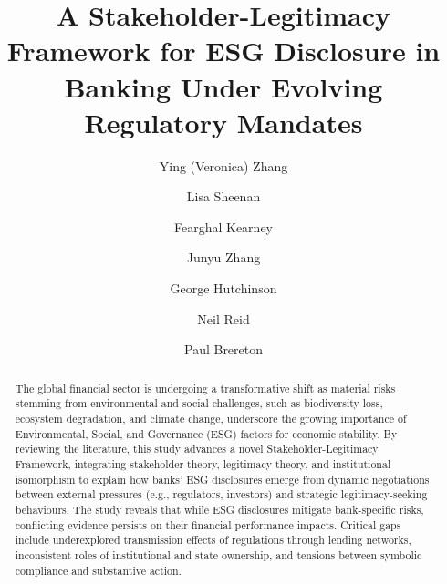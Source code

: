 \documentclass[
  authoryear]{elsarticle}
\begin{document}
\begin{frontmatter}
\title{A Stakeholder-Legitimacy Framework for ESG Disclosure in Banking
Under Evolving Regulatory Mandates}

\author[1]{Ying (Veronica) Zhang%
%
}
\author[1,2]{Lisa Sheenan%
%
}

\author[3]{Fearghal Kearney%
%
}

\author[1]{Junyu Zhang%
%
}

\author[1]{George Hutchinson%
%
}

\author[1,3,4]{Neil Reid%
%
}

\author[1]{Paul Brereton%
%
}








        
\begin{abstract}
The global financial sector is undergoing a transformative shift as
\hspace{0pt}material risks stemming from environmental and social
challenges, such as\hspace{0pt} biodiversity loss, ecosystem
degradation, \hspace{0pt}and climate change,\hspace{0pt}\hspace{0pt}
underscore the growing importance of Environmental, Social, and
Governance (ESG) factors for economic stability. By reviewing the
literature, this study advances a novel Stakeholder-Legitimacy
Framework, integrating stakeholder theory, legitimacy theory, and
institutional isomorphism to explain how banks' ESG disclosures emerge
from dynamic negotiations between external pressures (e.g., regulators,
investors) and strategic legitimacy-seeking behaviours. The study
reveals that while ESG disclosures mitigate bank-specific risks,
conflicting evidence persists on their financial performance impacts.
Critical gaps include underexplored transmission effects of regulations
through lending networks, inconsistent roles of institutional and state
ownership, and tensions between symbolic compliance and substantive
action.
\end{abstract}






\end{frontmatter}
\end{document}
